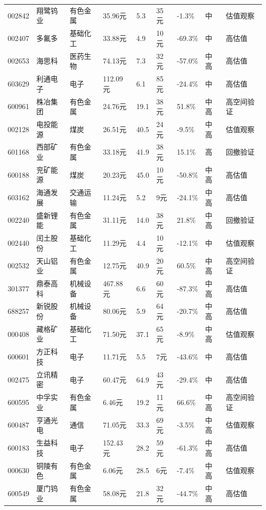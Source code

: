 \begin{longtable}{L{1.05cm}L{1.55cm}L{1.55cm}R{0.85cm}R{0.85cm}R{0.85cm}R{0.85cm}R{0.65cm}L{2.65cm}}
002842 & 翔鹭钨业 & 有色金属 & 35.96元 & 5.3 & 35元 & -1.3\% & 中 & 估值观察 \\
002407 & 多氟多 & 基础化工 & 33.88元 & 4.9 & 10元 & -69.3\% & 中 & 高估值 \\
002653 & 海思科 & 医药生物 & 74.13元 & 7.3 & 32元 & -57.0\% & 中高 & 高估值 \\
603629 & 利通电子 & 电子 & 112.09元 & 6.1 & 85元 & -24.4\% & 中 & 高估值 \\
600961 & 株冶集团 & 有色金属 & 24.76元 & 19.1 & 38元 & 51.8\% & 中高 & 高空间验证 \\
002128 & 电投能源 & 煤炭 & 26.51元 & 40.5 & 24元 & -9.5\% & 中高 & 估值观察 \\
601168 & 西部矿业 & 有色金属 & 33.18元 & 41.9 & 38元 & 15.1\% & 高 & 回撤验证 \\
600188 & 兖矿能源 & 煤炭 & 20.23元 & 45.0 & 10元 & -50.8\% & 中高 & 高估值 \\
603162 & 海通发展 & 交通运输 & 11.24元 & 5.2 & 9元 & -24.1\% & 中高 & 高估值 \\
002240 & 盛新锂能 & 有色金属 & 31.11元 & 14.0 & 38元 & 21.8\% & 中高 & 回撤验证 \\
002440 & 闰土股份 & 基础化工 & 11.29元 & 4.4 & 10元 & -12.1\% & 中 & 估值观察 \\
002532 & 天山铝业 & 有色金属 & 12.75元 & 40.9 & 20元 & 60.5\% & 中高 & 高空间验证 \\
301377 & 鼎泰高科 & 机械设备 & 467.88元 & 6.6 & 60元 & -87.3\% & 中高 & 高估值 \\
688257 & 新锐股份 & 机械设备 & 80.06元 & 5.9 & 64元 & -20.7\% & 中高 & 高估值 \\
000408 & 藏格矿业 & 基础化工 & 71.50元 & 37.1 & 65元 & -8.9\% & 中高 & 估值观察 \\
600601 & 方正科技 & 电子 & 11.71元 & 5.5 & 7元 & -43.6\% & 中 & 高估值 \\
002475 & 立讯精密 & 电子 & 60.47元 & 64.9 & 43元 & -29.4\% & 中 & 高估值 \\
600595 & 中孚实业 & 有色金属 & 6.46元 & 19.2 & 11元 & 66.6\% & 中高 & 高空间验证 \\
600487 & 亨通光电 & 通信 & 71.05元 & 33.3 & 69元 & -3.5\% & 中高 & 估值观察 \\
600183 & 生益科技 & 电子 & 152.43元 & 28.2 & 59元 & -61.3\% & 中高 & 高估值 \\
000630 & 铜陵有色 & 有色金属 & 6.06元 & 28.5 & 6元 & -7.4\% & 中高 & 估值观察 \\
600549 & 厦门钨业 & 有色金属 & 58.08元 & 21.8 & 32元 & -44.7\% & 中高 & 高估值 \\

\end{longtable}
